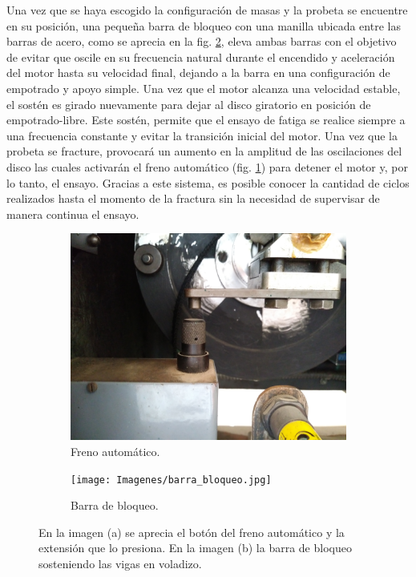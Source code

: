 Una vez que se haya escogido la configuración de masas y la probeta se encuentre en su posición, una pequeña barra de bloqueo con una manilla ubicada entre las barras de acero, como se aprecia en la fig. \ref{fig:barra_bloqueo}, eleva ambas barras con el objetivo de evitar que oscile en su frecuencia natural durante el encendido y aceleración del motor hasta su velocidad final, dejando a la barra en una configuración de empotrado y apoyo simple. Una vez que el motor alcanza una velocidad estable, el sostén es girado nuevamente para dejar al disco giratorio en posición de empotrado-libre. Este sostén, permite que el ensayo de fatiga se realice siempre a una frecuencia constante y evitar la transición inicial del motor. Una vez que la probeta se fracture, provocará un aumento en la amplitud de las oscilaciones del disco las cuales activarán el freno automático (fig. \ref{fig:freno_auto}) para detener el motor y, por lo tanto, el ensayo. Gracias a este sistema, es posible conocer la cantidad de ciclos realizados hasta el momento de la fractura sin la necesidad de supervisar de manera continua el ensayo.

\begin{figure}[h]
\centering
	\begin{subfigure}{0.55\linewidth}
		\centering
		\includegraphics[width=\linewidth]{Imagenes/freno_automatico.jpg}
		\caption{Freno automático.}\label{fig:freno_auto}
	\end{subfigure}
	\begin{subfigure}{0.365\linewidth}
		\centering
		\texttt{[image: Imagenes/barra\_bloqueo.jpg]}
		\caption{Barra de bloqueo.}\label{fig:barra_bloqueo}
	\end{subfigure}%
\caption{En la imagen (a) se aprecia el botón del freno automático y la extensión que lo presiona. En la imagen (b) la barra de bloqueo sosteniendo las vigas en voladizo.}
\label{fig:barra_freno}
\end{figure}

